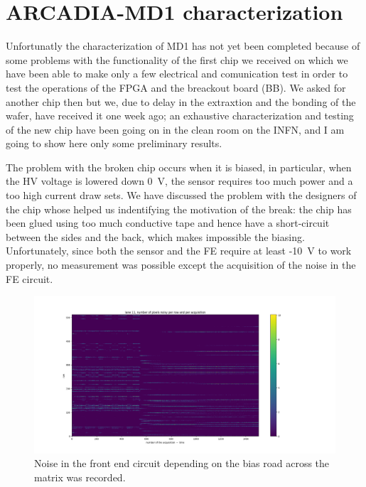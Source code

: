 \section{ARCADIA-MD1 characterization}
    Unfortunatly the characterization of MD1 has not yet been completed because of some problems with the functionality of the first chip we received on which we have been able to make only a few electrical and comunication test in order to test the operations of the FPGA and the breackout board (BB).
    We asked for another chip then but we, due to delay in the extraxtion and the bonding of the wafer, have received it one week ago; an exhaustive characterization and testing of the new chip have been going on in the clean room on the INFN, and I am going to show here only some preliminary results. 
    
    The problem with the broken chip occurs when it is biased, in particular, when the HV voltage is lowered down \SI{0}{V}, the sensor requires too much power and a too high current draw sets. We have discussed the problem with the designers of the chip whose helped us indentifying the motivation of the break: the chip has been glued using too much conductive tape and hence have a short-circuit between the sides and the back, which makes impossible the biasing.     
    Unfortunately, since both the sensor and the FE require at least -\SI{10}{V} to work properly, no measurement was possible except the acquisition of the noise in the FE circuit. 
    \begin{figure}[h!]
        \centering
        \includegraphics[width=.95\linewidth]{figures/charaterization/ARCADIA/pixel_per_row_per_acq_11_60.png}
        \caption{Noise in the front end circuit depending on the bias road across the matrix was recorded. }
        \label{fig:ARCADIA_noise}
    \end{figure}

